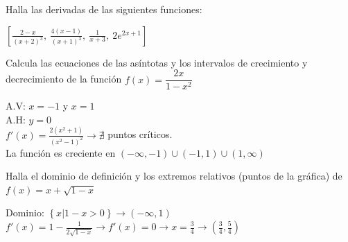 \documentclass[addpoints,spanish, 12pt,a4paper]{exam}
\begin{document}
\begin{questions}
\question Halla las derivadas de las siguientes funciones:
\begin{solution}
    $\displaystyle \left[ \frac{2 - x}{\left(x + 2\right)^{3}}, \  \frac{4 \left(x - 1\right)}{\left(x + 1\right)^{3}}, \  \frac{1}{x + 3}, \  2 e^{2 x + 1}\right]$
\end{solution}
 

\question[4] Calcula las ecuaciones de las asíntotas y los intervalos de crecimiento y decrecimiento de la función $f(x)=\dfrac{2x}{1-x^2}$
\begin{solution}
    A.V: $x=-1$ y $x=1$ \\
    A.H: $y=0$ \\
    $f'(x)=\frac{2 \left(x^{2} + 1\right)}{\left(x^{2} - 1\right)^{2}} \to \nexists$ puntos críticos. \\
    La función es creciente en $\left(-\infty, -1\right) \cup \left(-1, 1\right) \cup \left(1, \infty \right)$ 
\end{solution}

\question[3] Halla el dominio de definición y los extremos relativos (puntos de la gráfica) de $f(x)=x+\sqrt{1-x}$
\begin{solution}
    Dominio: $\left\{x| 1-x >0\right\}\to \left(-\infty, 1\right)$ \\
    $f'(x)=1 - \frac{1}{2 \sqrt{1 - x}} \to  f'(x)=0 \to x=\frac{3}{4} \to \left(\frac{3}{4}, \frac{5}{4}\right)$
    
\end{solution}


\end{questions}
\end{document}

